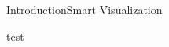 \begin{frame}{Introduction}{Smart Visualization}
  \begin{center}
      test
  \end{center}
  \end{frame}
